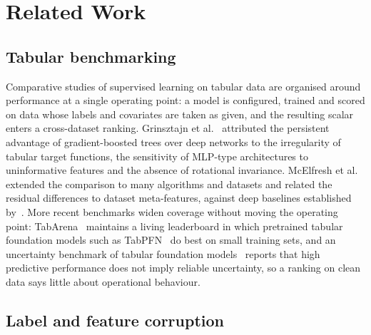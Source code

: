 \documentclass[pdflatex,sn-mathphys]{sn-jnl}
\theoremstyle{thmstyleone}
\theoremstyle{thmstyletwo}
\theoremstyle{thmstylethree}
\begin{document}
\section{Related Work}\label{sec:related}

\subsection{Tabular benchmarking}\label{sec:related:benchmarks}

Comparative studies of supervised learning on tabular data are organised around performance at a single operating point: a model is configured, trained and scored on data whose labels and covariates are taken as given, and the resulting scalar enters a cross-dataset ranking. Grinsztajn et al.~\cite{grinsztajn2022tree} attributed the persistent advantage of gradient-boosted trees over deep networks to the irregularity of tabular target functions, the sensitivity of MLP-type architectures to uninformative features and the absence of rotational invariance. McElfresh et al.~\cite{mcelfresh2023when} extended the comparison to many algorithms and datasets and related the residual differences to dataset meta-features, against deep baselines established by~\cite{gorishniy2021revisiting,borisov2024deep}. More recent benchmarks widen coverage without moving the operating point: TabArena~\cite{nick2025tabarena} maintains a living leaderboard in which pretrained tabular foundation models such as TabPFN~\cite{hollmann2023tabpfn,hollmann2025accurate} do best on small training sets, and an uncertainty benchmark of tabular foundation models~\cite{jos2026high} reports that high predictive performance does not imply reliable uncertainty, so a ranking on clean data says little about operational behaviour.

\subsection{Label and feature corruption}\label{sec:related:corruption}
\end{document}
